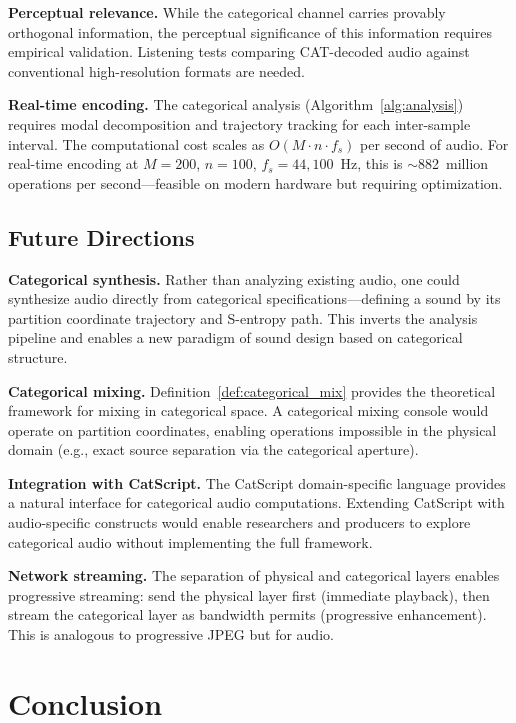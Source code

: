 \documentclass[twocolumn,10pt]{article}
\theoremstyle{remark}
\begin{document}
\textbf{Perceptual relevance.}
While the categorical channel carries provably orthogonal information, the perceptual significance of this information requires empirical validation. Listening tests comparing CAT-decoded audio against conventional high-resolution formats are needed.

\textbf{Real-time encoding.}
The categorical analysis (Algorithm~\ref{alg:analysis}) requires modal decomposition and trajectory tracking for each inter-sample interval. The computational cost scales as $O(M \cdot n \cdot f_s)$ per second of audio. For real-time encoding at $M = 200$, $n = 100$, $f_s = 44{,}100$~Hz, this is $\sim$882~million operations per second---feasible on modern hardware but requiring optimization.

\subsection{Future Directions}

\textbf{Categorical synthesis.}
Rather than analyzing existing audio, one could synthesize audio directly from categorical specifications---defining a sound by its partition coordinate trajectory and S-entropy path. This inverts the analysis pipeline and enables a new paradigm of sound design based on categorical structure.

\textbf{Categorical mixing.}
Definition~\ref{def:categorical_mix} provides the theoretical framework for mixing in categorical space. A categorical mixing console would operate on partition coordinates, enabling operations impossible in the physical domain (e.g., exact source separation via the categorical aperture).

\textbf{Integration with CatScript.}
The CatScript domain-specific language \cite{sachikonye2026catscript} provides a natural interface for categorical audio computations. Extending CatScript with audio-specific constructs would enable researchers and producers to explore categorical audio without implementing the full framework.

\textbf{Network streaming.}
The separation of physical and categorical layers enables progressive streaming: send the physical layer first (immediate playback), then stream the categorical layer as bandwidth permits (progressive enhancement). This is analogous to progressive JPEG but for audio.


\section{Conclusion}
\label{sec:conclusion}
\end{document}
